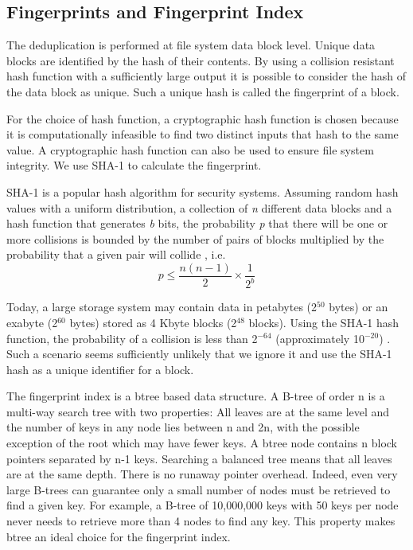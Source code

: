 \documentclass[final]{ols}
\begin{document}
\subsection{Fingerprints and Fingerprint Index}
The deduplication is performed at file system data block level. Unique data blocks are identified by the hash of their contents. By using a collision resistant hash function with a sufficiently large output it is possible to consider the hash of the data block as unique. Such a unique hash is called the fingerprint of a block. 

For the choice of hash function, a cryptographic hash function is chosen because it is computationally infeasible to find two distinct inputs that hash to the same value. A cryptographic hash function can also be used to ensure file system integrity. We use SHA-1 to calculate the fingerprint. 

SHA-1 is a popular hash algorithm for security systems. Assuming random hash values with a uniform distribution, a collection of \textit{n} different data blocks and a hash function that generates \textit{b} bits, the probability \textit{p} that there will be one or more collisions is bounded by the number of pairs of blocks multiplied by the probability that a given pair will collide \cite{1}
, i.e. 
$$p \leq \frac{n(n-1)}{2} \times \frac{1}{2^b}$$

Today, a large storage system may contain data in petabytes (2$^{50}$ bytes) or an exabyte (2$^{60}$ bytes) stored as 4 Kbyte blocks (2$^{48}$ blocks). Using the SHA-1 hash function, the probability of a collision is less than 2$^{-64}$ (approximately 10$^{-20}$) \cite{1}. Such a scenario seems sufficiently unlikely that we ignore it and use the SHA-1 hash as a unique identifier for a block.

The fingerprint index is a btree based data structure. A B-tree of order n is a multi-way search tree with two properties: All leaves are at the same level and the number of keys in any node lies between n and 2n, with the possible exception of the root which may have fewer keys. A btree node contains n block pointers separated by n-1 keys. 
Searching a balanced tree means that all leaves are at the same depth. There is no runaway pointer overhead. Indeed, even very large B-trees can guarantee only a small number of nodes must be retrieved to find a given key. For example, a B-tree of 10,000,000 keys with 50 keys per node never needs to retrieve more than 4 nodes to find any key. This property makes btree an ideal choice for the fingerprint index. 
\end{document}
